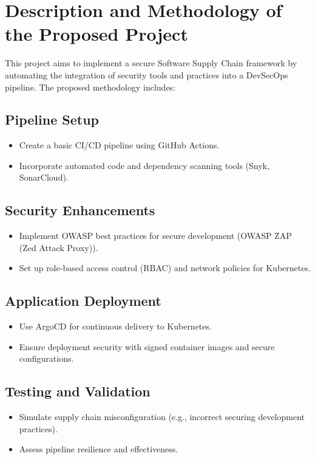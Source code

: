 \documentclass[a4paper,12pt]{article}
\begin{document}
\section{Description and Methodology of the Proposed Project}
This project aims to implement a secure Software Supply Chain framework by automating the integration of security tools and practices into a DevSecOps pipeline. The proposed methodology includes:

\subsection*{Pipeline Setup}
\begin{itemize}
    \item Create a basic CI/CD pipeline using GitHub Actions.
    \item Incorporate automated code and dependency scanning tools (Snyk, SonarCloud).
\end{itemize}

\subsection*{Security Enhancements}
\begin{itemize}
    \item Implement OWASP best practices for secure development (OWASP ZAP (Zed Attack Proxy)).
    \item Set up role-based access control (RBAC) and network policies for Kubernetes.
\end{itemize}

\subsection*{Application Deployment}
\begin{itemize}
    \item Use ArgoCD for continuous delivery to Kubernetes.
    \item Ensure deployment security with signed container images and secure configurations.
\end{itemize}

\subsection*{Testing and Validation}
\begin{itemize}
    \item Simulate supply chain misconfiguration (e.g., incorrect securing development practices).
    \item Assess pipeline resilience and effectiveness.
\end{itemize}
\end{document}
